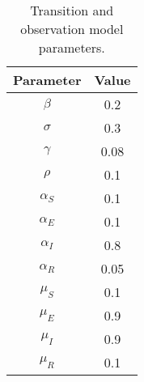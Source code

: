 \begin{center}
    \begin{table}[H]
        \begin{center}
        \begin{tabular}{cc}
        Parameter & Value\\
        \hline
        $\beta$ & 0.2\\
        $\sigma$ & 0.3\\
        $\gamma$ & 0.08\\
        $\rho$ & 0.1\\
        $\alpha_S$ & 0.1\\
        $\alpha_E$ & 0.1\\
        $\alpha_I$ & 0.8\\
        $\alpha_R$ & 0.05\\
        $\mu_S$ & 0.1\\
        $\mu_E$ & 0.9\\
        $\mu_I$ & 0.9\\
        $\mu_R$ & 0.1\\
        \end{tabular}
        \caption{Transition and observation model parameters.}
        \label{tab:trans_obs_params}
        \end{center}
    \end{table}
\end{center}























































